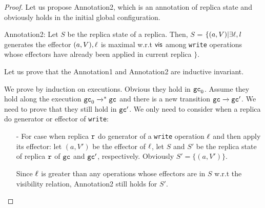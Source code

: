 \begin {proof}
Let us propose Annotation2, which is an annotation of replica state and obviously holds in the initial global configuration.


\noindent Annotation2: Let $S$ be the replica state of a replica. Then, $S$ =  $\{ (a,V) \vert \exists \ell, l$ generates the effector $(a,V), \ell$ is maximal w.r.t $\mathsf{vis}$ among {\tt write} operations whose effectors have already been applied in current replica $\}$.



Let us prove that the Annotation1 and Annotation2 are inductive invariant.

We prove by induction on executions. Obvious they hold in $\mathtt{gc}_0$. Assume they hold along the execution $\mathtt{gc}_0 \xrightarrow{}^* \mathtt{gc}$ and there is a new transition $\mathtt{gc} \xrightarrow{} \mathtt{gc}'$. We need to prove that they still hold in $\mathtt{gc}'$. We only need to consider when a replica do generator or effector of {\tt write}:

\begin{itemize}
\setlength{\itemsep}{0.5pt}
\item[-] For case when replica $\mathtt{r}$ do generator of a {\tt write} operation $\ell$ and then apply its effector: let $(a,V')$ be the effector of $\ell$, let $S$ and $S'$ be the replica state of replica $\mathtt{r}$ of $\mathtt{gc}$ and $\mathtt{gc}'$, respectively. Obviously $S' = \{ (a,V') \}$.

    Since $\ell$ is greater than any operations whose effectors are in $S$ w.r.t the visibility relation, Annotation2 still holds for $S'$. %




\end{itemize}
\end{proof}
